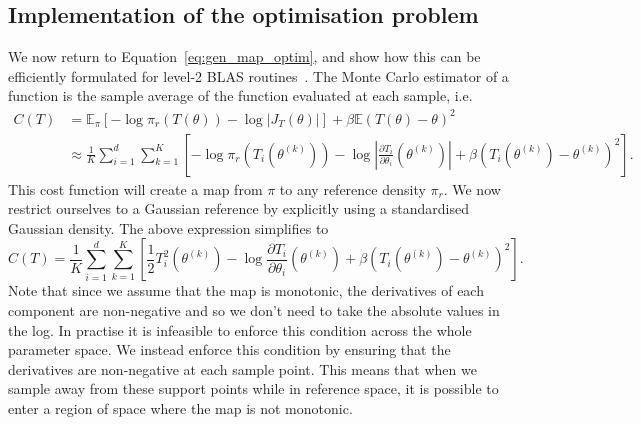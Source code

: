 \documentclass[final]{siamltex}
\begin{document}
\subsection{Implementation of the optimisation problem}\label{sec:transport_implementation}

We now return to Equation~\eqref{eq:gen_map_optim}, and show how this can be efficiently formulated
for level-2 BLAS routines~\cite{choi1992scalapack}. The Monte Carlo estimator of a function is the
sample average of the function evaluated at each sample, i.e.
\begin{align*}
	C(T) &= \mathbb{E}_\pi\left[ -\log\pi_r(T(\theta)) - \log|J_T(\theta)|\right] +
			\beta\mathbb{E}(T(\theta)-\theta)^2 \\
		&\approx \frac{1}{K}\sum\limits_{i=1}^d \! \sum\limits_{k=1}^K \left[-\log\pi_r(T_i(\theta^{(k)})) -
			\log\left|\frac{\partial T_i}{\partial \theta_i}(\theta^{(k)})\right| + \beta(T_i(\theta^{(k)})-\theta^{(k)})^2\right].
\end{align*}
This cost function will create a map from $\pi$ to any reference density $\pi_r$. We now restrict ourselves to a Gaussian reference by explicitly using a standardised Gaussian density. The above expression simplifies to
\begin{equation}\label{eq:gauss_map_optim}
	C(T) = \frac{1}{K}\sum\limits_{i=1}^d \! \sum\limits_{k=1}^K \left[\frac{1}{2}
		T_i^2(\theta^{(k)}) - \log\frac{\partial T_i}{\partial \theta_i}(\theta^{(k)}) +
		\beta(T_i(\theta^{(k)})-\theta^{(k)})^2\right].
\end{equation}
Note that since we assume that the map is monotonic, the derivatives of each component are
non-negative and so we don't need to take the absolute values in the log. In practise it is infeasible to enforce this condition across the whole parameter space. We instead enforce this condition by ensuring that the derivatives are non-negative at each sample point. This means that when we sample away from these support points while in reference space, it is possible to enter a region of space where the map is not monotonic.
\end{document}
